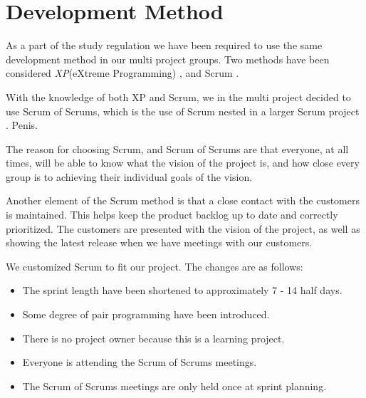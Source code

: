 \section{Development Method}

As a part of the study regulation we have been required to use the same development method in our multi project groups. Two methods have been considered \textit{XP}(eXtreme Programming) \cite{XP}, and Scrum \cite{SCRUM}.

With the knowledge of both XP and Scrum, we in the multi project decided to use Scrum of Scrums, which is the use of Scrum nested in a larger Scrum project \cite{ScrumOfScrums}. Penis. 

The reason for choosing Scrum, and Scrum of Scrums are that everyone, at all times, will be able to know what the vision of the project is, and how close every group is to achieving their individual goals of the vision.

Another element of the Scrum method is that a close contact with the customers is maintained. This helps keep the product backlog up to date and correctly prioritized. The customers are presented with the vision of the project, as well as showing the latest release when we have meetings with our customers.

We customized Scrum to fit our project. The changes are as follows:
\begin{itemize}
	\item The sprint length have been shortened to approximately 7 - 14 half days.
	\item Some degree of pair programming have been introduced.
	\item There is no project owner because this is a learning project.
	\item Everyone is attending the Scrum of Scrums meetings.
	\item The Scrum of Scrums meetings are only held once at sprint planning.
\end{itemize}